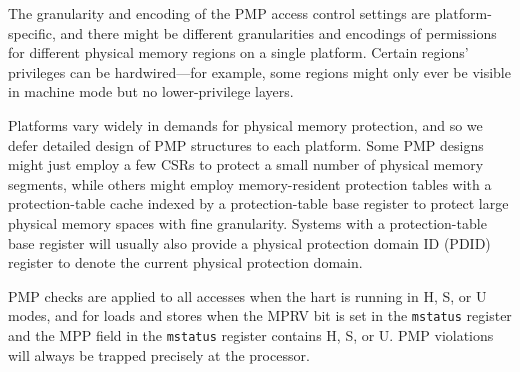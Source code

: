 The granularity and encoding of the PMP access control settings are
platform-specific, and there might be different granularities and
encodings of permissions for different physical memory regions on a
single platform.  Certain regions' privileges can be hardwired---for
example, some regions might only ever be visible in machine mode but
no lower-privilege layers.

\begin{commentary}
Platforms vary widely in demands for physical memory protection, and
so we defer detailed design of PMP structures to each platform.  Some
PMP designs might just employ a few CSRs to protect a small number of
physical memory segments, while others might employ memory-resident
protection tables with a protection-table cache indexed by a
protection-table base register to protect large physical memory spaces
with fine granularity.  Systems with a protection-table base register
will usually also provide a physical protection domain ID (PDID)
register to denote the current physical protection domain.
\end{commentary}

PMP checks are applied to all accesses when the hart is running in H,
S, or U modes, and for loads and stores when the MPRV bit is set in
the {\tt mstatus} register and the MPP field in the {\tt mstatus}
register contains H, S, or U.  PMP violations will always be trapped
precisely at the processor.

